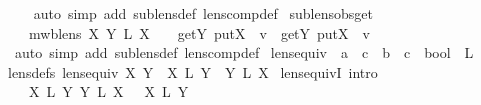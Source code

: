 \begin{isabellebody}
\ \ %
\endisadelimproof
%
\isatagproof
{}\isamarkupfalse%
\ {\isacharparenleft}auto\ simp\ add{\isacharcolon}\ sublens{\isacharunderscore}def\ lens{\isacharunderscore}comp{\isacharunderscore}def{\isacharparenright}%
\endisatagproof
{\isafoldproof}%
%
\isadelimproof
\isanewline
%
\endisadelimproof
\isanewline
{}\isamarkupfalse%
\ sublens{\isacharunderscore}obs{\isacharunderscore}get{\isacharcolon}\isanewline
\ \ {\isachardoublequoteopen}{\isasymlbrakk}\ mwb{\isacharunderscore}lens\ X{\isacharsemicolon}\ Y\ {\isasymsubseteq}\isactrlsub L\ X\ {\isasymrbrakk}\ {\isasymLongrightarrow}\ \ get\isactrlbsub Y\isactrlesub \ {\isacharparenleft}put\isactrlbsub X\isactrlesub \ {\isasymsigma}\ v{\isacharparenright}\ {\isacharequal}\ get\isactrlbsub Y\isactrlesub \ {\isacharparenleft}put\isactrlbsub X\isactrlesub \ {\isasymrho}\ v{\isacharparenright}{\isachardoublequoteclose}\isanewline
%
\isadelimproof
\ \ %
\endisadelimproof
%
\isatagproof
{}\isamarkupfalse%
\ {\isacharparenleft}auto\ simp\ add{\isacharcolon}\ sublens{\isacharunderscore}def\ lens{\isacharunderscore}comp{\isacharunderscore}def{\isacharparenright}%
\endisatagproof
{\isafoldproof}%
%
\isadelimproof
\isanewline
%
\endisadelimproof
\isanewline
{}\isamarkupfalse%
\ lens{\isacharunderscore}equiv\ {\isacharcolon}{\isacharcolon}\ {\isachardoublequoteopen}{\isacharparenleft}{\isacharprime}a\ {\isasymLongrightarrow}\ {\isacharprime}c{\isacharparenright}\ {\isasymRightarrow}\ {\isacharparenleft}{\isacharprime}b\ {\isasymLongrightarrow}\ {\isacharprime}c{\isacharparenright}\ {\isasymRightarrow}\ bool{\isachardoublequoteclose}\ {\isacharparenleft}\ {\isachardoublequoteopen}{\isasymapprox}\isactrlsub L{\isachardoublequoteclose}\ {}{}{\isacharparenright}\ \isanewline
{\isacharbrackleft}lens{\isacharunderscore}defs{\isacharbrackright}{\isacharcolon}\ {\isachardoublequoteopen}lens{\isacharunderscore}equiv\ X\ Y\ {\isacharequal}\ {\isacharparenleft}X\ {\isasymsubseteq}\isactrlsub L\ Y\ {\isasymand}\ Y\ {\isasymsubseteq}\isactrlsub L\ X{\isacharparenright}{\isachardoublequoteclose}\isanewline
\isanewline
{}\isamarkupfalse%
\ lens{\isacharunderscore}equivI\ {\isacharbrackleft}intro{\isacharbrackright}{\isacharcolon}\isanewline
\ \ {\isachardoublequoteopen}{\isasymlbrakk}\ X\ {\isasymsubseteq}\isactrlsub L\ Y{\isacharsemicolon}\ Y\ {\isasymsubseteq}\isactrlsub L\ X\ {\isasymrbrakk}\ {\isasymLongrightarrow}\ X\ {\isasymapprox}\isactrlsub L\ Y{\isachardoublequoteclose}\isanewline
%
\isadelimproof

\end{isabellebody}
